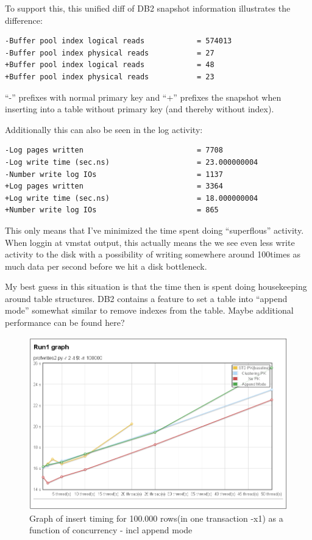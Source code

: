 To support this, this unified diff of DB2 snapshot information illustrates
the difference:
\begin{verbatim}
-Buffer pool index logical reads            = 574013
-Buffer pool index physical reads           = 27
+Buffer pool index logical reads            = 48
+Buffer pool index physical reads           = 23
\end{verbatim}
``-'' prefixes with normal primary key and ``+'' prefixes the snapshot when
inserting into a table without primary key (and thereby without index).

Additionally this can also be seen in the log activity:
\begin{verbatim}
-Log pages written                          = 7708
-Log write time (sec.ns)                    = 23.000000004
-Number write log IOs                       = 1137
+Log pages written                          = 3364
+Log write time (sec.ns)                    = 18.000000004
+Number write log IOs                       = 865
\end{verbatim}

This only means that I've minimized the time spent doing ``superflous''
activity. When loggin at vmstat output, this actually means the we see even less
write activity to the disk with a possibility of writing somewhere around
100times as much data per second before we hit a disk bottleneck.

My best guess in this situation is that the time then is spent doing
housekeeping around table structures. DB2 contains a feature to set a table into
``append mode'' somewhat similar to remove indexes from the table. Maybe
additional performance can be found here?
\begin{figure}
  \centering
  \includegraphics[width=13cm]{assignment2/run1append}
  \caption[Insert performance]{Graph of insert timing for 100.000 rows(in one
  transaction -x1) as a function of concurrency - incl append mode}\label{fig:part1aappnd}
\end{figure}


